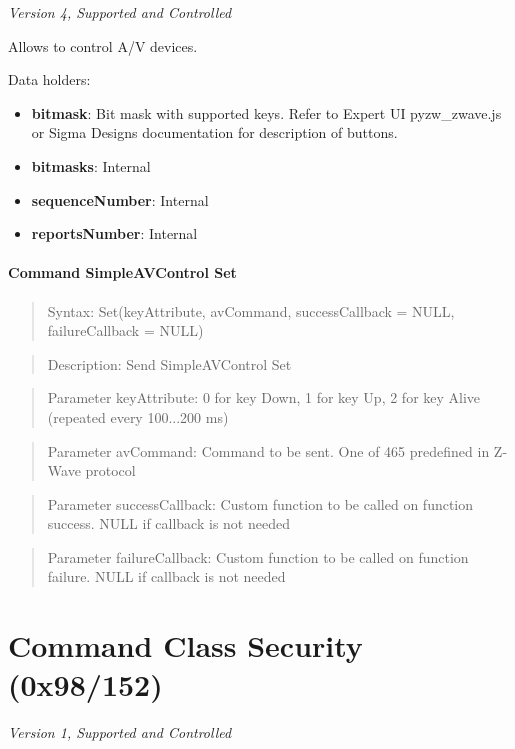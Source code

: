 \textit{Version 4, Supported and Controlled}
\newline

Allows to control A/V devices.
\newline

\noindent
Data holders:

\begin{itemize}
\item \textbf{bitmask}: Bit mask with supported keys. Refer to Expert UI pyzw\_zwave.js or Sigma Designs documentation for description of buttons.
\item \textbf{bitmasks}: Internal
\item \textbf{sequenceNumber}: Internal
\item \textbf{reportsNumber}: Internal
\end{itemize}

\paragraph{Command SimpleAVControl Set}
\begin{quote}Syntax: Set(keyAttribute, avCommand, successCallback = NULL, failureCallback = NULL)\end{quote}
\begin{quote}Description: Send SimpleAVControl Set\end{quote}
\begin{quote}Parameter keyAttribute: 0 for key Down, 1 for key Up, 2 for key Alive (repeated every 100...200 ms)\end{quote}
\begin{quote}Parameter avCommand: Command to be sent. One of 465 predefined in Z-Wave protocol\end{quote}
\begin{quote}Parameter successCallback: Custom function to be called on function success. NULL if callback is not needed\end{quote}
\begin{quote}Parameter failureCallback: Custom function to be called on function failure. NULL if callback is not needed\end{quote}



\section{Command Class Security (0x98/152)}

\textit{Version 1, Supported and Controlled}
\newline

